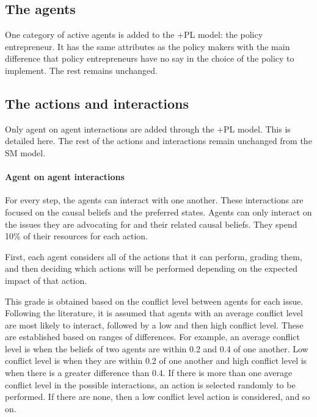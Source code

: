 \documentclass[11pt]{article}
\begin{document}

\subsection{The agents}

One category of active agents is added to the +PL model: the policy entrepreneur. It has the same attributes as the policy makers with the main difference that policy entrepreneurs have no say in the choice of the policy to implement. The rest remains unchanged.



\subsection{The actions and interactions}


Only agent on agent interactions are added through the +PL model. This is detailed here. The rest of the actions and interactions remain unchanged from the SM model.

\paragraph{Agent on agent interactions}

For every step, the agents can interact with one another. These interactions are focused on the causal beliefs and the preferred states. Agents can only interact on the issues they are advocating for and their related causal beliefs. They spend 10\% of their resources for each action.


First, each agent considers all of the actions that it can perform, grading them, and then deciding which actions will be performed depending on the expected impact of that action.

This grade is obtained based on the conflict level between agents for each issue. Following the literature, it is assumed that agents with an average conflict level are most likely to interact, followed by a low and then high conflict level. These are established based on ranges of differences. For example, an average conflict level is when the beliefs of two agents are within 0.2 and 0.4 of one another. Low conflict level is when they are within 0.2 of one another and high conflict level is when there is a greater difference than 0.4. If there is more than one average conflict level in the possible interactions, an action is selected randomly to be performed. If there are none, then a low conflict level action is considered, and so on.
\end{document}
